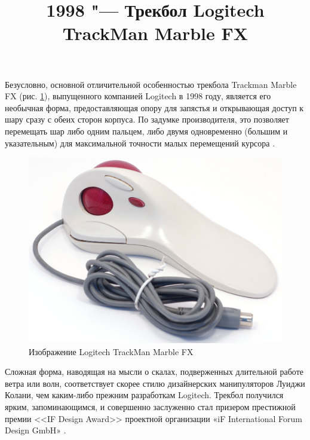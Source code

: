 \documentclass[11pt, a4paper]{article}
\begin{document}
\title{1998 "--- Трекбол Logitech TrackMan Marble FX}
\date{}
\maketitle
{}
Безусловно, основной отличительной особенностью трекбола Trackman Marble FX (рис. \ref{fig:trackman}), выпущенного компанией Logitech в 1998 году, является его необычная форма, предоставляющая опору для запястья и открывающая доступ к шару сразу с обеих сторон корпуса. По задумке производителя, это позволяет перемещать шар либо одним пальцем, либо двумя одновременно (большим и указательным) для максимальной точности малых перемещений курсора \cite{marbleBoot}.

\begin{figure}[h]
    \centering
    \includegraphics[scale=0.38]{1998_logitech_trackman_marble_fx/pic_30.jpg}
    \caption{Изображение Logitech TrackMan Marble FX}
    \label{fig:trackman}
\end{figure}

Сложная форма, наводящая на мысли о скалах, подверженных длительной работе ветра или волн, соответствует скорее стилю дизайнерских манипуляторов Луиджи Колани, чем каким-либо прежним разработкам Logitech. Трекбол получился ярким, запоминающимся, и совершенно заслуженно стал призером престижной премии <<IF Design Award>> проектной организации «iF International Forum Design GmbH» \cite{award}.
\end{document}
